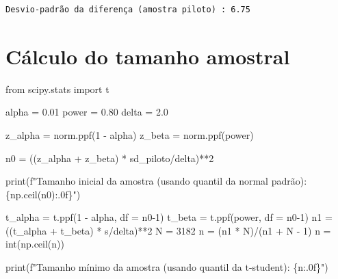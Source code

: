 \documentclass[
  letterpaper,
  DIV=11,
  numbers=noendperiod]{scrreprt}
\newenvironment{Shaded}{\begin{snugshade}}{\end{snugshade}}
\newcommand{\BuiltInTok}[1]{\textcolor[rgb]{0.00,0.23,0.31}{#1}}
\newcommand{\DecValTok}[1]{\textcolor[rgb]{0.68,0.00,0.00}{#1}}
\newcommand{\FloatTok}[1]{\textcolor[rgb]{0.68,0.00,0.00}{#1}}
\newcommand{\ImportTok}[1]{\textcolor[rgb]{0.00,0.46,0.62}{#1}}
\newcommand{\NormalTok}[1]{\textcolor[rgb]{0.00,0.23,0.31}{#1}}
\newcommand{\OperatorTok}[1]{\textcolor[rgb]{0.37,0.37,0.37}{#1}}
\newcommand{\SpecialCharTok}[1]{\textcolor[rgb]{0.37,0.37,0.37}{#1}}
\newcommand{\SpecialStringTok}[1]{\textcolor[rgb]{0.13,0.47,0.30}{#1}}
\begin{document}
\begin{verbatim}
Desvio-padrão da diferença (amostra piloto) : 6.75
\end{verbatim}

\section{Cálculo do tamanho
amostral}\label{cuxe1lculo-do-tamanho-amostral}

\begin{Shaded}
\begin{Highlighting}[]
\ImportTok{from}\NormalTok{ scipy.stats }\ImportTok{import}\NormalTok{ t}

\NormalTok{alpha }\OperatorTok{=} \FloatTok{0.01} 
\NormalTok{power }\OperatorTok{=} \FloatTok{0.80} 
\NormalTok{delta }\OperatorTok{=} \FloatTok{2.0} 

\NormalTok{z\_alpha }\OperatorTok{=}\NormalTok{ norm.ppf(}\DecValTok{1} \OperatorTok{{-}}\NormalTok{ alpha) }
\NormalTok{z\_beta }\OperatorTok{=}\NormalTok{ norm.ppf(power) }

\NormalTok{n0 }\OperatorTok{=}\NormalTok{ ((z\_alpha }\OperatorTok{+}\NormalTok{ z\_beta) }\OperatorTok{*}\NormalTok{ sd\_piloto}\OperatorTok{/}\NormalTok{delta)}\OperatorTok{**}\DecValTok{2}

\BuiltInTok{print}\NormalTok{(}\SpecialStringTok{f"Tamanho inicial da amostra (usando quantil da normal padrão): }\SpecialCharTok{\{}\NormalTok{np}\SpecialCharTok{.}\NormalTok{ceil(n0)}\SpecialCharTok{:.0f\}}\SpecialStringTok{"}\NormalTok{)}


\NormalTok{t\_alpha }\OperatorTok{=}\NormalTok{ t.ppf(}\DecValTok{1} \OperatorTok{{-}}\NormalTok{ alpha, df }\OperatorTok{=}\NormalTok{ n0}\OperatorTok{{-}}\DecValTok{1}\NormalTok{)}
\NormalTok{t\_beta }\OperatorTok{=}\NormalTok{ t.ppf(power, df }\OperatorTok{=}\NormalTok{ n0}\OperatorTok{{-}}\DecValTok{1}\NormalTok{)}
\NormalTok{n1 }\OperatorTok{=}\NormalTok{ ((t\_alpha }\OperatorTok{+}\NormalTok{ t\_beta) }\OperatorTok{*}\NormalTok{ s}\OperatorTok{/}\NormalTok{delta)}\OperatorTok{**}\DecValTok{2}
\NormalTok{N }\OperatorTok{=} \DecValTok{3182}
\NormalTok{n }\OperatorTok{=}\NormalTok{ (n1 }\OperatorTok{*}\NormalTok{ N)}\OperatorTok{/}\NormalTok{(n1 }\OperatorTok{+}\NormalTok{ N }\OperatorTok{{-}} \DecValTok{1}\NormalTok{) }
\NormalTok{n }\OperatorTok{=} \BuiltInTok{int}\NormalTok{(np.ceil(n)) }

\BuiltInTok{print}\NormalTok{(}\SpecialStringTok{f"Tamanho mínimo da amostra (usando quantil da t{-}student): }\SpecialCharTok{\{}\NormalTok{n}\SpecialCharTok{:.0f\}}\SpecialStringTok{"}\NormalTok{)}
\end{Highlighting}
\end{Shaded}
\end{document}
